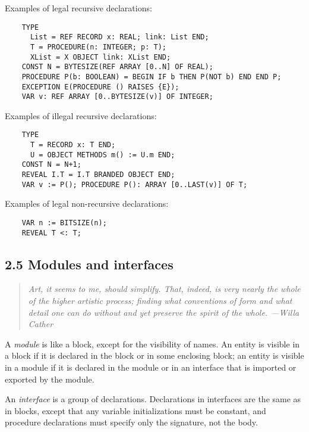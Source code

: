 \documentclass[10pt]{article}
\begin{document}
  Examples of legal recursive declarations: 
\begin{verbatim}
    TYPE 
      List = REF RECORD x: REAL; link: List END;
      T = PROCEDURE(n: INTEGER; p: T);
      XList = X OBJECT link: XList END;
    CONST N = BYTESIZE(REF ARRAY [0..N] OF REAL);
    PROCEDURE P(b: BOOLEAN) = BEGIN IF b THEN P(NOT b) END END P;
    EXCEPTION E(PROCEDURE () RAISES {E});
    VAR v: REF ARRAY [0..BYTESIZE(v)] OF INTEGER;
\end{verbatim}



  Examples of illegal recursive declarations: 
\begin{verbatim}
    TYPE 
      T = RECORD x: T END; 
      U = OBJECT METHODS m() := U.m END;
    CONST N = N+1;
    REVEAL I.T = I.T BRANDED OBJECT END;
    VAR v := P(); PROCEDURE P(): ARRAY [0..LAST(v)] OF T;
\end{verbatim}



  Examples of legal non-recursive declarations: 
\begin{verbatim}
    VAR n := BITSIZE(n);
    REVEAL T <: T;
\end{verbatim}



 
\subsection*{2.5 Modules and interfaces}


 
\begin{quote}
\emph{ Art, it seems to me, should simplify. That, indeed, is very nearly the whole of the higher artistic process; finding what conventions of form and what detail one can do without and yet preserve the spirit of the whole. ---Willa Cather }
\end{quote}



 A \emph{module}
 is like a block, except for the visibility of names. An entity is visible in a block if it is declared in the block or in some enclosing block; an entity is visible in a module if it is declared in the module or in an interface that is imported or exported by the module. 


 An \emph{interface}
 is a group of declarations. Declarations in interfaces are the same as in blocks, except that any variable initializations must be constant, and procedure declarations must specify only the signature, not the body. 
\end{document}
